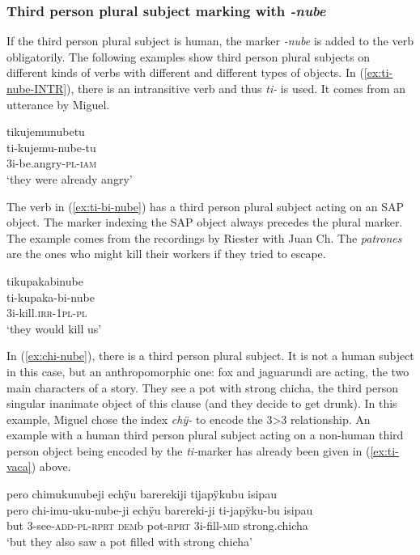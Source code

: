  \subsubsection{Third person plural subject marking with \textit{-nube}} If the third person plural subject is human, the marker \textit{-nube} is added to the verb obligatorily. The following examples show third person plural subjects on different kinds of verbs with different  and different types of objects. In (\ref{ex:ti-nube-INTR}), there is an intransitive verb and thus \textit{ti-} is used. It comes from an utterance by Miguel.
 
 
\ea\label{ex:ti-nube-INTR}
\begingl 
\glpreamble tikujemunubetu\\
\gla ti-kujemu-nube-tu\\ 
\glb 3i-be.angry-\textsc{pl}-\textsc{iam}\\ 
\glft ‘they were already angry’
\trailingcitation{[jmx-c120429ls-x5.225]}
\xe

The verb in (\ref{ex:ti-bi-nube}) has a third person plural subject acting on an SAP object. The marker indexing the SAP object always precedes the plural marker. The example comes from the recordings by Riester with Juan Ch. The \textit{patrones} are the ones who might kill their workers if they tried to escape.

\ea\label{ex:ti-bi-nube}
\begingl 
\glpreamble tikupakabinube\\
\gla ti-kupaka-bi-nube\\ 
\glb 3i-kill.\textsc{irr}-1\textsc{pl}-\textsc{pl}\\ 
\glft ‘they would kill us’
\trailingcitation{[nxx-p630101g-1.182]}
\xe

In (\ref{ex:chi-nube}), there is a third person plural subject. It is not a human subject in this case, but an anthropomorphic one: fox and jaguarundi are acting, the two main characters of a story. They see a pot with strong chicha, the third person singular inanimate object of this clause (and they decide to get drunk). In this example, Miguel chose the index \textit{chÿ-} to encode the 3>3 relationship. An example with a human third person plural subject acting on a non-human third person object being encoded by the \textit{ti-}marker has already been given in (\ref{ex:ti-vaca}) above.

\ea\label{ex:chi-nube}
\begingl 
\glpreamble pero chimukunubeji echÿu barerekiji tijapÿkubu isipau\\
\gla pero chi-imu-uku-nube-ji echÿu barereki-ji ti-japÿku-bu isipau\\ 
\glb but 3-see-\textsc{add}-\textsc{pl}-\textsc{rprt} \textsc{dem}b pot-\textsc{rprt} 3i-fill-\textsc{mid} strong.chicha\\ 
\glft ‘but they also saw a pot filled with strong chicha’
\trailingcitation{[jmx-n120429ls-x5.328]}
\xe
{}


